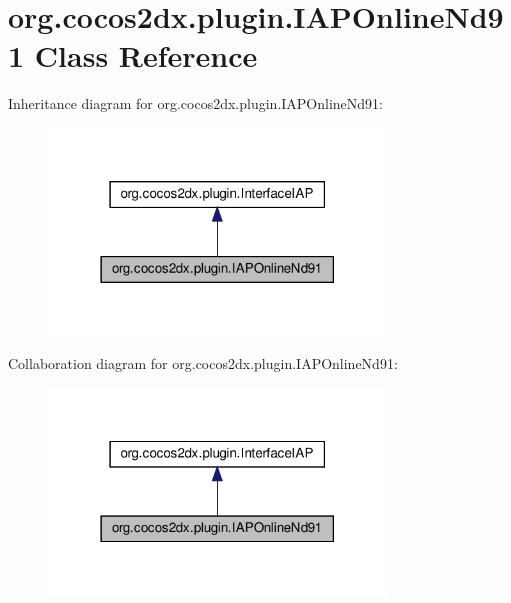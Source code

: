 \hypertarget{classorg_1_1cocos2dx_1_1plugin_1_1IAPOnlineNd91}{}\section{org.\+cocos2dx.\+plugin.\+I\+A\+P\+Online\+Nd91 Class Reference}
\label{classorg_1_1cocos2dx_1_1plugin_1_1IAPOnlineNd91}


Inheritance diagram for org.\+cocos2dx.\+plugin.\+I\+A\+P\+Online\+Nd91\+:
\nopagebreak
\begin{figure}[H]
\begin{center}
\leavevmode
\includegraphics[width=254pt]{classorg_1_1cocos2dx_1_1plugin_1_1IAPOnlineNd91__inherit__graph}
\end{center}
\end{figure}


Collaboration diagram for org.\+cocos2dx.\+plugin.\+I\+A\+P\+Online\+Nd91\+:
\nopagebreak
\begin{figure}[H]
\begin{center}
\leavevmode
\includegraphics[width=254pt]{classorg_1_1cocos2dx_1_1plugin_1_1IAPOnlineNd91__coll__graph}
\end{center}
\end{figure}
